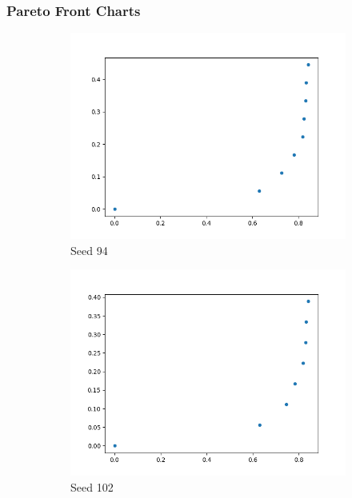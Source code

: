 \documentclass{article}
\begin{document}
\subsubsection*{Pareto Front Charts}
\begin{figure}[h!]
	\centering
	\begin{subfigure}[b]{0.3\linewidth}
		\includegraphics[width=\linewidth]{vehicle_94.png}
		\caption{Seed 94}
	\end{subfigure}
	\begin{subfigure}[b]{0.3\linewidth}
		\includegraphics[width=\linewidth]{vehicle_102.png}
		\caption{Seed 102}
	\end{subfigure}
	\begin{subfigure}[b]{0.3\linewidth}

\end{subfigure}
\end{figure}
\end{document}
